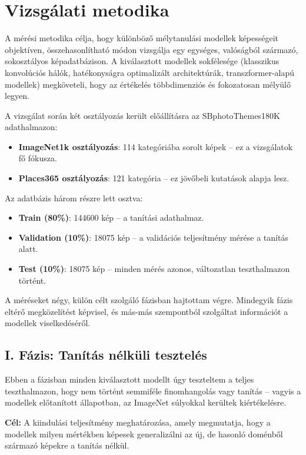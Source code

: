 \chapter{Vizsgálati metodika}

  A mérési metodika célja, hogy különböző mélytanulási modellek képességeit objektíven, összehasonlítható módon vizsgálja egy egységes, valóságból származó, sokosztályos képadatbázison. A kiválasztott modellek sokfélesége (klasszikus konvolúciós hálók, hatékonyságra optimalizált architektúrák, transzformer-alapú modellek) megköveteli, hogy az értékelés többdimenziós és fokozatosan mélyülő legyen.
  
  A vizsgálat során két osztályozás került előállításra az SBphotoThemes180K adathalmazon:
  \begin{itemize}
    \item \textbf{ImageNet1k osztályozás}: 114 kategóriába sorolt képek – ez a vizsgálatok fő fókusza.
    \item \textbf{Places365 osztályozás}: 121 kategória – ez jövőbeli kutatások alapja lesz.
  \end{itemize}
  
  Az adatbázis három részre lett osztva:
  \begin{itemize}
    \item \textbf{Train (80\%)}: 144600 kép – a tanítási adathalmaz.
    \item \textbf{Validation (10\%)}: 18075 kép – a validációs teljesítmény mérése a tanítás alatt.
    \item \textbf{Test (10\%)}: 18075 kép – minden mérés azonos, változatlan teszthalmazon történt.
  \end{itemize}
  
  A méréseket négy, külön célt szolgáló fázisban hajtottam végre. Mindegyik fázis eltérő megközelítést képvisel, és más-más szempontból szolgáltat információt a modellek viselkedéséről.
  
  
  \section{I. Fázis: Tanítás nélküli tesztelés}
  
  Ebben a fázisban minden kiválasztott modellt úgy teszteltem a teljes teszthalmazon, hogy nem történt semmiféle finomhangolás vagy tanítás – vagyis a modellek előtanított állapotban, az ImageNet súlyokkal kerültek kiértékelésre.
  
  \textbf{Cél:} A kiindulási teljesítmény meghatározása, amely megmutatja, hogy a modellek milyen mértékben képesek generalizálni az új, de hasonló doménből származó képekre a tanítás nélkül.
  
